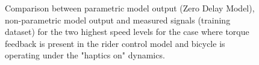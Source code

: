  \begin{figure}
    \centering
    \begin{subfigure}[b]{\textwidth}
        \centering
        \caption{}
        \label{fig:zdm_fit3}
    \end{subfigure}
    \begin{subfigure}[b]{\textwidth}
        \centering
        \caption{}
        \label{fig:zdm_fit4}
    \end{subfigure}
    
    \caption{Comparison between parametric model output (Zero Delay Model), non-parametric model output and measured signals (training dataset) for the two highest speed levels for the case where torque feedback is present in the rider control model and bicycle is operating under the "haptics on" dynamics.}
    \label{fig:zdm_fitB}
 \end{figure}


